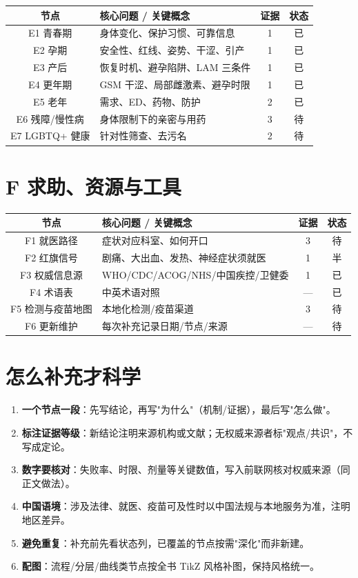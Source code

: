 \documentclass[12pt,UTF8,openany]{ctexbook}
\begin{document}
\begin{tabularx}{\linewidth}{C X c c}
\toprule
\textbf{节点} & \textbf{核心问题 / 关键概念} & \textbf{证据} & \textbf{状态} \\
\midrule
E1 青春期 & 身体变化、保护习惯、可靠信息 & 1 & 已 \\
E2 孕期 & 安全性、红线、姿势、干涩、引产 & 1 & 已 \\
E3 产后 & 恢复时机、避孕陷阱、LAM 三条件 & 1 & 已 \\
E4 更年期 & GSM 干涩、局部雌激素、避孕时限 & 1 & 已 \\
E5 老年 & 需求、ED、药物、防护 & 2 & 已 \\
E6 残障/慢性病 & 身体限制下的亲密与用药 & 3 & 待 \\
E7 LGBTQ+ 健康 & 针对性筛查、去污名 & 2 & 待 \\
\bottomrule
\end{tabularx}

\section{F 求助、资源与工具}

\begin{tabularx}{\linewidth}{C X c c}
\toprule
\textbf{节点} & \textbf{核心问题 / 关键概念} & \textbf{证据} & \textbf{状态} \\
\midrule
F1 就医路径 & 症状对应科室、如何开口 & 3 & 待 \\
F2 红旗信号 & 剧痛、大出血、发热、神经症状须就医 & 1 & 半 \\
F3 权威信息源 & WHO/CDC/ACOG/NHS/中国疾控/卫健委 & 1 & 已 \\
F4 术语表 & 中英术语对照 & --- & 已 \\
F5 检测与疫苗地图 & 本地化检测/疫苗渠道 & 3 & 待 \\
F6 更新维护 & 每次补充记录日期/节点/来源 & --- & 待 \\
\bottomrule
\end{tabularx}

\section{怎么补充才科学}

\begin{enumerate}[leftmargin=2em,itemsep=0.3em]
  \item \textbf{一个节点一段}：先写结论，再写"为什么"（机制/证据），最后写"怎么做"。
  \item \textbf{标注证据等级}：新结论注明来源机构或文献；无权威来源者标"观点/共识"，不写成定论。
  \item \textbf{数字要核对}：失败率、时限、剂量等关键数值，写入前联网核对权威来源（同正文做法）。
  \item \textbf{中国语境}：涉及法律、就医、疫苗可及性时以中国法规与本地服务为准，注明地区差异。
  \item \textbf{避免重复}：补充前先看状态列，已覆盖的节点按需"深化"而非新建。
  \item \textbf{配图}：流程/分层/曲线类节点按全书 TikZ 风格补图，保持风格统一。
\end{enumerate}
\end{document}
